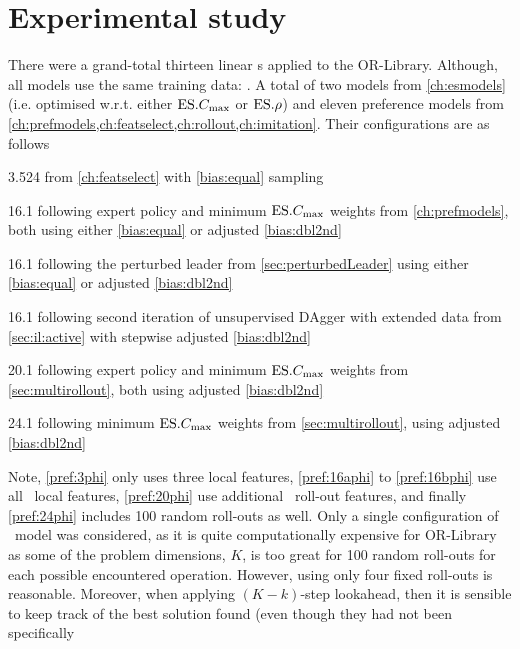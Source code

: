 \section{Experimental study}
There were a grand-total thirteen linear \cdr s applied to the OR-Library. 
Although, all models use the same training data: .
A total of two models from \cref{ch:esmodels} (i.e. optimised w.r.t. either 
$\text{ES}.{C_{\max}}$ or $\text{ES}.{\rho}$) and eleven preference models from 
\cref{ch:prefmodels,ch:featselect,ch:rollout,ch:imitation}.
Their configurations are as follows
\begin{enumerate*}
    \item \label{pref:3phi} 3.524 from \cref{ch:featselect} with 
    \ref{bias:equal} sampling
    \item \label{pref:16aphi} 16.1 following expert policy and minimum 
    $\text{ES}.{C_{\max}}$ weights from \cref{ch:prefmodels}, both using either 
    \ref{bias:equal} or adjusted \ref{bias:dbl2nd}
    \item 16.1 following the perturbed leader from \cref{sec:perturbedLeader}  
    using either \ref{bias:equal} or adjusted \ref{bias:dbl2nd}
    \item \label{pref:16bphi} 16.1 following second iteration of unsupervised 
    DAgger with extended data from \cref{sec:il:active} with stepwise adjusted 
    \ref{bias:dbl2nd}
    \item \label{pref:20phi} 20.1 following expert policy and minimum 
    $\text{ES}.{C_{\max}}$ weights from \cref{sec:multirollout}, both using adjusted 
    \ref{bias:dbl2nd}
    \item \label{pref:24phi} 24.1 following minimum $\text{ES}.{C_{\max}}$ weights from 
    \cref{sec:multirollout}, using adjusted \ref{bias:dbl2nd}
\end{enumerate*} 
Note, \ref{pref:3phi} only uses three local features, \ref{pref:16aphi} to 
\ref{pref:16bphi} use all \NrFeatLocal\ local features, \ref{pref:20phi} use 
additional \phiSDRRelated\ roll-out features, and finally \ref{pref:24phi} 
includes 100 random roll-outs as well.\linebreak
Only a single configuration of \phiRNDRelated\ model was considered, as it is 
quite computationally expensive for OR-Library as some of the problem 
dimensions, $K$, is too great for 100 random roll-outs for each possible 
encountered operation. However, using only four fixed roll-outs is reasonable.
Moreover, when applying $(K-k)$-step lookahead, then it is sensible to keep 
track of the best solution found (even though they had not been specifically 
